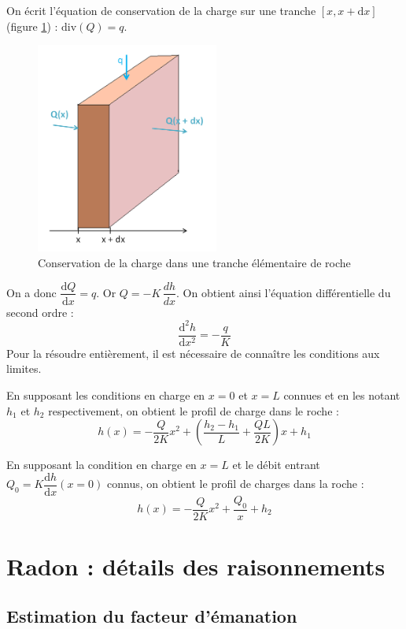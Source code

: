 \documentclass{article}
\begin{document}
On écrit l’équation de conservation de la charge sur une tranche $[x, x + \text{d}x]$ (figure \ref{fig:schema_carre_ecoulement}) : $\text{div} (Q)=q$.

\begin{figure}[H]
    \centering
    \includegraphics[width=6cm]{A_III_B_4.png}
    \caption{Conservation de la charge dans une tranche élémentaire de roche}
    \label{fig:schema_carre_ecoulement}
\end{figure}

On a donc $\dfrac{\text{d}Q}{\text{d}x}=q$.
Or $Q= -K\, \dfrac{dh}{dx}$.
On obtient ainsi l’équation différentielle du second ordre : $$\dfrac{\text{d}^2h}{\text{d}x^2}=-\frac{q}{K}$$
Pour la résoudre entièrement, il est nécessaire de connaître les conditions aux limites. 

En supposant les conditions en charge en $x = 0$ et $x = L$ connues et en les notant $h_1$ et $h_2$ respectivement, on obtient le profil de charge dans le roche :
$$h(x) = -\frac{Q}{2K}x^2 + \left(\frac{h_2 - h_1}{L} + \frac{QL}{2K}\right)x + h_1$$

En supposant la condition en charge en $x = L$ et le débit entrant $Q_0 = K \dfrac{\text{d}h}{\text{d}x}(x = 0)$ connus, on obtient le profil de charges dans la roche :
$$h(x) = -\frac{Q}{2K}x^2 + \frac{Q_0}x + h_2$$

\newpage
\section{Radon : détails des raisonnements}
\label{annexe:detail_modele_radon_sec}

\subsection{Estimation du facteur d'émanation}
\label{annexe:emanation}
\end{document}

